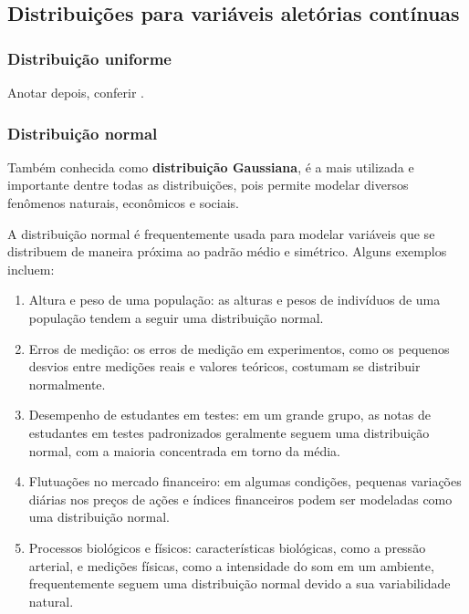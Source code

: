 \subsection{Distribuições para variáveis aletórias contínuas}%

\subsubsection{Distribuição uniforme}

Anotar depois, conferir \parencite[p.~327]{favero}.

\subsubsection{Distribuição normal}

Também conhecida como \textbf{distribuição Gaussiana}, é a mais utilizada e
importante dentre todas as distribuições, pois permite modelar diversos
fenômenos naturais, econômicos e sociais.

A distribuição normal é frequentemente usada para modelar variáveis que se
distribuem de maneira próxima ao padrão médio e simétrico. Alguns exemplos
incluem:

\begin{enumerate}
\item Altura e peso de uma população: as alturas e pesos de indivíduos de uma
população tendem a seguir uma distribuição normal.
\item Erros de medição: os erros de medição em experimentos, como os pequenos
desvios entre medições reais e valores teóricos, costumam se distribuir
normalmente.
\item Desempenho de estudantes em testes: em um grande grupo, as notas de
estudantes em testes padronizados geralmente seguem uma distribuição
normal, com a maioria concentrada em torno da média.
\item Flutuações no mercado financeiro: em algumas condições, pequenas
variações diárias nos preços de ações e índices financeiros podem ser
modeladas como uma distribuição normal.
\item Processos biológicos e físicos: características biológicas, como a
pressão arterial, e medições físicas, como a intensidade do som em um
ambiente, frequentemente seguem uma distribuição normal devido a sua
variabilidade natural.
\end{enumerate}


